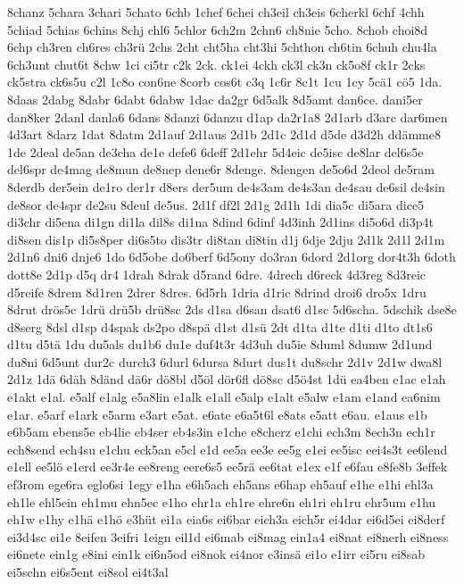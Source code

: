 {8chanz 5chara 3chari 5chato 6chb 1chef 6chei ch3eil ch3eis 6cherkl
6chf 4chh 5chiad 5chias 6chins 8chj chl6 5chlor 6ch2m 2chn6 ch8nie
5cho.  8chob choi8d 6chp ch3ren ch6res ch3r\"u 2chs 2cht cht5ha
cht3hi 5chthon ch6tin 6chuh chu4la 6ch3unt chut6t 8chw 1ci ci5tr c2k
2ck.  ck1ei 4ckh ck3l ck3n ck5o8f ck1r 2cks ck5stra ck6s5u c2l 1c8o
con6ne 8corb cos6t c3q 1c6r 8c1t 1cu 1cy 5c\"a1 c\"o5 1da.
8daas 2dabg 8dabr 6dabt 6dabw 1dac da2gr 6d5alk 8d5amt dan6ce.
dani5er dan8ker 2danl danla6 6dans 8danzi 6danzu d1ap da2r1a8 2d1arb
d3arc dar6men 4d3art 8darz 1dat 8datm 2d1auf 2d1aus 2d1b 2d1c 2d1d
d5de d3d2h dd\"amme8 1de 2deal de5an de3cha de1e defe6 6deff 2d1ehr
5d4eic de5isc de8lar del6s5e del6spr de4mag de8mun de8nep dene6r
8denge.  8dengen de5o6d 2deol de5ram 8derdb der5ein de1ro der1r d8ers
der5um de4s3am de4s3an de4sau de6sil de4sin de8sor de4spr de2su 8deul
de5us.  2d1f df2l 2d1g 2d1h 1di dia5c di5ara dice5 di3chr di5ena di1gn
di1la dil8s di1na 8dind 6dinf 4d3inh 2d1ins di5o6d di3p4t di8sen dis1p
di5s8per di6s5to 
dis3tr %
di8tan di8tin d1j 6dje 2dju 2d1k 2d1l 2d1m
2d1n6 dni6 dnje6 1do 6d5obe do6berf 6d5ony do3ran 6dord 2d1org dor4t3h
6doth dott8e 2d1p d5q dr4 1drah 8drak d5rand 6dre.  4drech
d6reck 4d3reg 8d3reic d5reife 8drem 8d1ren 2drer 8dres.  6d5rh 1dria
d1ric 8drind droi6 dro5x 1dru 8drut dr\"os5c 1dr\"u dr\"u5b
dr\"u8sc 2ds d1sa d6san dsat6 d1sc 5d6scha.  5dschik dse8e d8serg
8dsl d1sp d4spak ds2po d8sp\"a d1st d1s\"u 2dt d1ta d1te d1ti
d1to dt1s6 d1tu d5t\"a 1du du5als du1b6 du1e duf4t3r 4d3uh du5ie
8duml 8dumw 2d1und du8ni 6d5unt dur2c durch3 6durl 6dursa 8durt 
dus1t %
du8schr 2d1v 2d1w dwa8l 2d1z 1d\"a 6d\"ah 8d\"and d\"a6r
d\"o8bl d5\"ol d\"or6fl d\"o8sc d5\"o4st 
1d\"u ea4ben e1ac e1ah e1akt e1al.  e5alf e1alg e5a8lin e1alk e1all
e5alp e1alt e5alw e1am e1and ea6nim e1ar.  e5arf e1ark e5arm e3art
e5at.  e6ate e6a5t6l e8ats e5att e6au.  e1aus e1b e6b5am ebens5e
eb4lie eb4ser eb4s3in e1che e8cherz e1chi ech3m 8ech3n ech1r ech8send
ech4su e1chu eck5an e5cl e1d ee5a ee3e ee5g e1ei ee5isc eei4s3t
ee6lend e1ell ee5l\"o e1erd ee3r4e ee8reng eere6s5 ee5r\"a
ee6tat e1ex e1f e6fau e8fe8b 3effek ef3rom ege6ra eglo6si 1egy e1ha
e6h5ach eh5ans e6hap eh5auf e1he e1hi ehl3a eh1le ehl5ein eh1mu ehn5ec
e1ho ehr1a eh1re ehre6n eh1ri eh1ru ehr5um e1hu eh1w e1hy e1h\"a
e1h\"o e3h\"ut ei1a eia6s ei6bar eich3a eich5r ei4dar ei6d5ei
ei8derf ei3d4sc ei1e 8eifen 3eifri 1eign eil1d ei6mab ei8mag ein1a4
ei8nat ei8nerh ei8ness ei6nete ein1g e8ini ein1k ei6n5od ei8nok ei4nor
e3ins\"a ei1o e1irr ei5ru ei8sab ei5schn ei6s5ent ei8sol ei4t3al
}
